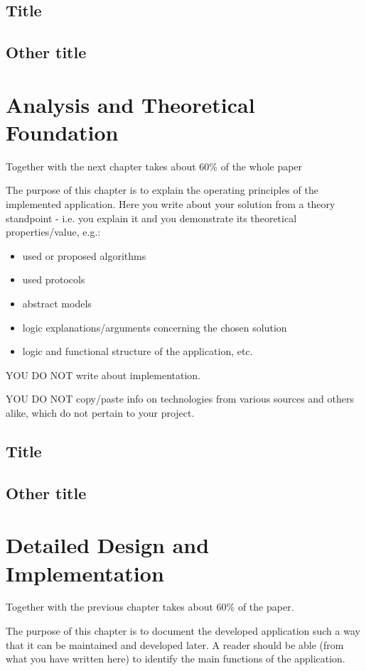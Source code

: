 \documentclass[12pt,a4paper,twoside]{report}
\begin{document}
\section{Title}
\section{Other title}


\chapter{Analysis and Theoretical Foundation}
\label{ch:analysis}

Together with the next chapter takes about 60\% of the whole paper

The purpose of this chapter is to explain the operating principles of the implemented application.
Here you write about your solution from a theory standpoint - i.e. you explain it and you demonstrate its theoretical properties/value, e.g.:
\begin{itemize}
 \item used or proposed algorithms
 \item used protocols
 \item abstract models
 \item logic explanations/arguments concerning the chosen solution
 \item logic and functional structure of the application, etc.
\end{itemize}

{\color{red} YOU DO NOT write about implementation.

YOU DO NOT copy/paste info on technologies from various sources and others alike, which do not pertain to your project.
}

\section{Title}
\section{Other title}


\chapter{Detailed Design and Implementation}

Together with the previous chapter takes about 60\% of the paper.

The purpose of this chapter is to document the developed application such a way that it can be maintained and developed later. A reader should be able (from what you have written here) to identify the main functions of the application.
\end{document}
